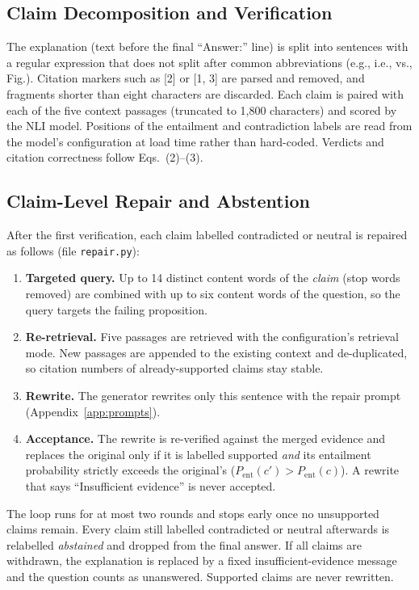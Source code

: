 \documentclass[11pt]{article}
\begin{document}
\subsection{Claim Decomposition and Verification}
The explanation (text before the final ``Answer:'' line) is split into sentences with a regular expression that does not split after common abbreviations (e.g., i.e., vs., Fig.). Citation markers such as [2] or [1, 3] are parsed and removed, and fragments shorter than eight characters are discarded. Each claim is paired with each of the five context passages (truncated to 1,800 characters) and scored by the NLI model. Positions of the entailment and contradiction labels are read from the model's configuration at load time rather than hard-coded. Verdicts and citation correctness follow Eqs.~(2)--(3).

\subsection{Claim-Level Repair and Abstention}\label{sec:repair}
After the first verification, each claim labelled contradicted or neutral is repaired as follows (file \texttt{repair.py}):
\begin{enumerate}
\item \textbf{Targeted query.} Up to 14 distinct content words of the \emph{claim} (stop words removed) are combined with up to six content words of the question, so the query targets the failing proposition.
\item \textbf{Re-retrieval.} Five passages are retrieved with the configuration's retrieval mode. New passages are appended to the existing context and de-duplicated, so citation numbers of already-supported claims stay stable.
\item \textbf{Rewrite.} The generator rewrites only this sentence with the repair prompt (Appendix~\ref{app:prompts}).
\item \textbf{Acceptance.} The rewrite is re-verified against the merged evidence and replaces the original only if it is labelled supported \emph{and} its entailment probability strictly exceeds the original's ($P_{\text{ent}}(c')>P_{\text{ent}}(c)$). A rewrite that says ``Insufficient evidence'' is never accepted.
\end{enumerate}
The loop runs for at most two rounds and stops early once no unsupported claims remain. Every claim still labelled contradicted or neutral afterwards is relabelled \emph{abstained} and dropped from the final answer. If all claims are withdrawn, the explanation is replaced by a fixed insufficient-evidence message and the question counts as unanswered. Supported claims are never rewritten.
\end{document}

